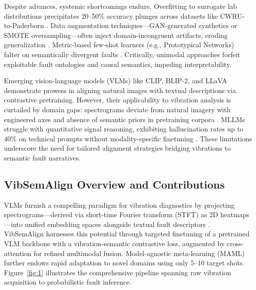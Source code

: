 Despite advances, systemic shortcomings endure. Overfitting to surrogate lab distributions precipitates 20--50\% accuracy plunges across datasets like CWRU-to-Paderborn \cite{cite17}. Data augmentation techniques—GAN-generated synthetics or SMOTE oversampling—often inject domain-incongruent artifacts, eroding generalization \cite{cite18}. Metric-based few-shot learners (e.g., Prototypical Networks) falter on semantically divergent faults \cite{cite19}. Critically, unimodal approaches forfeit exploitable fault ontologies and causal semantics, impeding interpretability.

Emerging vision-language models (VLMs) like CLIP, BLIP-2, and LLaVA demonstrate prowess in aligning natural images with textual descriptions via contrastive pretraining. However, their applicability to vibration analysis is curtailed by domain gaps: spectrograms deviate from natural imagery with engineered axes and absence of semantic priors in pretraining corpora \cite{cite27}\cite{cite28}. MLLMs struggle with quantitative signal reasoning, exhibiting hallucination rates up to 40\% on technical prompts without modality-specific finetuning \cite{cite29}. These limitations underscore the need for tailored alignment strategies bridging vibrations to semantic fault narratives.

\subsection{VibSemAlign Overview and Contributions}

VLMs furnish a compelling paradigm for vibration diagnostics by projecting spectrograms—derived via short-time Fourier transform (STFT) as 2D heatmaps—into unified embedding spaces alongside textual fault descriptors \cite{cite20}\cite{cite21}. VibSemAlign harnesses this potential through targeted finetuning of a pretrained VLM backbone with a vibration-semantic contrastive loss, augmented by cross-attention for refined multimodal fusion. Model-agnostic meta-learning (MAML) further endows rapid adaptation to novel domains using only 5--10 target shots. Figure~\ref{fig:1} illustrates the comprehensive pipeline spanning raw vibration acquisition to probabilistic fault inference.

